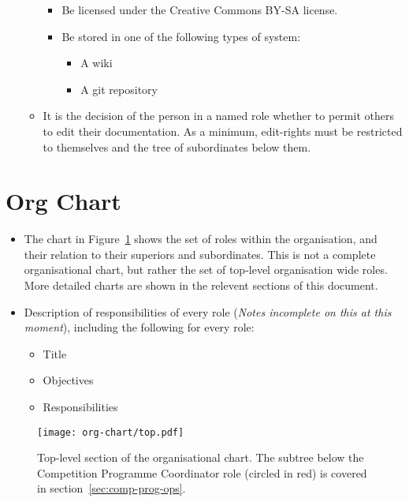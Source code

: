 \begin{itemize}
\begin{itemize}
\begin{itemize}
  \item Be licensed under the Creative Commons BY-SA license.

  \item Be stored in one of the following types of system:
    \begin{itemize}
    \item A wiki
    \item A git repository
    \end{itemize}

    \end{itemize}

  \item It is the decision of the person in a named role whether to permit others to edit their documentation.  As a minimum, edit-rights must be restricted to themselves and the tree of subordinates below them.

  \end{itemize}

\end{itemize}

\section{Org Chart}

\begin{itemize}
\item The chart in Figure~\ref{fig:org-chart-top} shows the set of roles within the organisation, and their relation to their superiors and subordinates. This is not a complete organisational chart, but rather the set of top-level organisation wide roles. More detailed charts are shown in the relevent sections of this document.
\item Description of responsibilities of every role (\textit{Notes incomplete on this at this moment}), including the following for every role:
  \begin{itemize}
  \item Title
  \item Objectives
  \item Responsibilities
  \end{itemize}
\end{itemize}

\begin{figure}[h]
  \begin{center}
    \texttt{[image: org-chart/top.pdf]}
  \end{center}
  \caption{\label{fig:org-chart-top}Top-level section of the organisational chart.  The subtree below the Competition Programme Coordinator role (circled in red) is covered in section~\ref{sec:comp-prog-ops}.}
\end{figure}

